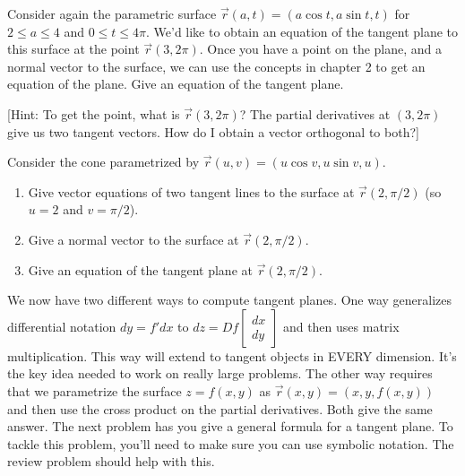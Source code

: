 \begin{problem}
 Consider again the parametric surface $\vec r(a,t) = (a\cos t, a\sin t, t)$ for $2\leq a\leq 4$ and $0\leq t\leq 4\pi$. 
 We'd like to obtain an equation of the tangent plane to this surface at the point $\vec r(3,2\pi)$. Once you have a point on the plane, and a normal vector to the surface, we can use the concepts in chapter 2 to get an equation of the plane. Give an equation of the tangent plane.

 [Hint: To get the point, what is $\vec r(3,2\pi)$? The partial derivatives at $(3,2\pi)$ give us two tangent vectors.  How do I obtain a vector orthogonal to both?]
\end{problem}

\begin{problem}%
%
 Consider the cone parametrized by $\vec r(u,v)=(u\cos v, u\sin v,u)$.
 \begin{enumerate}
 \item Give vector equations of two tangent lines to the surface at $\vec r(2,\pi/2)$ (so $u=2$ and $v=\pi/2$).
 \item Give a normal vector to the surface at $\vec r(2,\pi/2)$.
 \item Give an equation of the tangent plane at $\vec r(2,\pi/2)$.
 \end{enumerate}
\end{problem}


We now have two different ways to compute tangent planes.  One way generalizes differential notation $dy=f'dx$ to 
$dz = Df \begin{bmatrix}dx\\dy\end{bmatrix}$ and then uses matrix multiplication. This way will extend to tangent objects in EVERY dimension.  It's the key idea needed to work on really large problems.  The other way requires that we parametrize the surface $z=f(x,y)$ as $\vec r(x,y)=(x,y,f(x,y))$ and then use the cross product on the partial derivatives. Both give the same answer. The next problem has you give a general formula for a tangent plane.  To tackle this problem, you'll need to make sure you can use symbolic notation.  The review problem should help with this.

